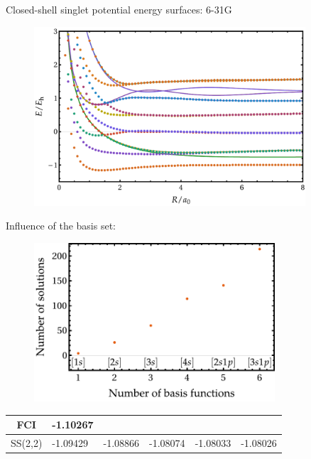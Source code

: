 \documentclass[10pt]{beamer}
\begin{document}
\begin{frame}{Closed-shell singlet potential energy surfaces:  6-31G}
  \begin{figure}
    \includegraphics[width=0.9\textwidth]{Figures/fig_7b.pdf}
  \end{figure}
\end{frame}

\begin{frame}{Influence of the basis set: }
  \pause[1]
  \begin{figure}
    \includegraphics[width=0.8\textwidth]{Figures/fig_3a.pdf}
  \end{figure}
  \pause[2]
  \begin{table}
    \label{tab:tab_4}
    \begin{tabular}{clllll}
      FCI & -1.10267 & & & &\\
      \hline
      SS(2,2) & -1.09429 & -1.08866 & -1.08074 & -1.08033 & -1.08026 \\
    \end{tabular}
  \end{table}
\end{frame}
\end{document}
